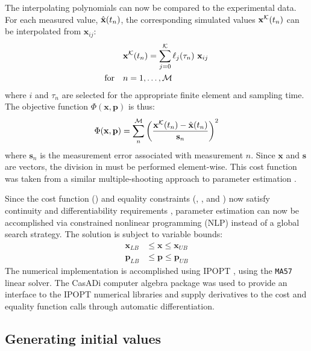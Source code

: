 The interpolating polynomials can now be compared to the experimental data.
For each measured value, $\hat{\mathbf{x}}(t_n)$, the corresponding simulated values ${\mathbf{x}}^{\cal K}(t_n)$ can be interpolated from ${\bm x}_{ij}$:
\begin{equation}
  \begin{aligned} &{\mathbf{x}}^{\cal K}(t_n) = \sum^{\cal K}_{j=0} \ell_j(\tau_n) \
    {\mathbf{x}}_{ij} \\
    \textrm{for}\quad &n = 1,\ldots,{\cal M}
  \end{aligned}
\end{equation}
where $i$ and $\tau_n$ are selected for the appropriate finite element and sampling time. 
The objective function $\Phi({\bm x},{\bm p})$ is thus:
\begin{equation} \label{eq:cost}
  \Phi({\mathbf{x}},{\mathbf{p}}) = \sum_n^{\cal M} \left(\frac{{\mathbf{x}}^{\cal K}(t_n) -
\hat{\mathbf{x}}(t_n)}{{\mathbf{s}}_n}\right)^2
\end{equation}
where ${\bm s}_{n}$ is the measurement error associated with measurement $n$. 
Since ${\bm x}$ and $\bm s$ are vectors, the division in \fref{eq:cost} must be performed element-wise. 
This cost function was taken from a similar multiple-shooting approach to parameter estimation \cite{Bock2007}. 

Since the cost function () and equality constraints (, , and ) now satisfy continuity and differentiability requirements \cite{Floudas1995}, parameter estimation can now be accomplished via constrained nonlinear programming (NLP) instead of a global search strategy. 
The solution is subject to variable bounds:
\begin{equation}
  \begin{aligned} {\bm x}_{LB} &\le {\bm x} \le {\bm x}_{UB} \\ {\bm p}_{LB}
    &\le {\bm p} \le {\bm p}_{UB}
  \label{eq:bounds}
\end{aligned}
\end{equation}
The numerical implementation is accomplished using IPOPT \cite{Wachter2005}, using the \texttt{MA57} \cite{HSL2011} linear solver. 
The CasADi computer algebra package \cite{Andersson2013b} was used to provide an interface to the IPOPT numerical libraries and supply derivatives to the cost and equality function calls through automatic differentiation.

\subsection{Generating initial values}

